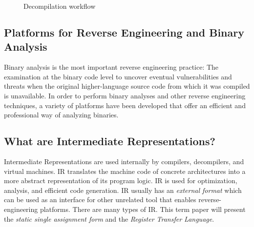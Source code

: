 \documentclass[seminar]{plai}
\begin{document}
\begin{figure}[htbp]
\centering
{}
\caption{Decompilation workflow\cite{reverse-engineering-vs-disassembly}}
\label{fig:interpret-bytecode}
\end{figure}


\subsection{Platforms for Reverse Engineering and Binary Analysis}
\label{sec:platforms-for-reverse-engineering-binaryAnalysis-background}
Binary analysis is the most important reverse engineering practice: The examination at the binary code level to uncover eventual vulnerabilities and threats when the original higher-language source code from which it was compiled is unavailable.
In order to perform binary analyses and other reverse engineering techniques, a variety of platforms have been developed that offer an efficient and professional way of analyzing binaries.

\subsection{What are Intermediate Representations?}
\label{sec:ir-background}
Intermediate Representations are used internally by compilers, decompilers, and virtual machines.
IR  translates the machine code of concrete architectures into a more abstract representation of its program logic. IR is used for optimization, analysis, and efficient code generation.
IR usually has an \textit{external format} which can be used as an interface for other unrelated tool that enables reverse-engineering platforms.
There are many types of IR. This term paper will present the \textit{static single assignment form} and the \textit{Register Transfer Language}.\\
\end{document}
